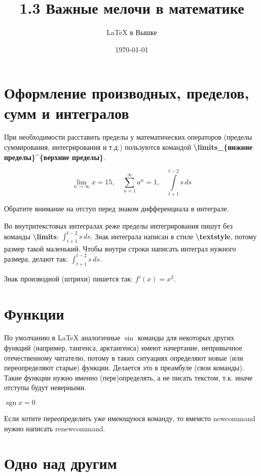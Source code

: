\documentclass[a4paper,12pt]{article}
\author{\LaTeX{} в Вышке}
\title{1.3 Важные мелочи в математике}
\date{\today}
\newcommand{\sgn}{\mathop{\mathrm{sgn}}\nolimits}
\begin{document}

\maketitle %


\section{Оформление производных, пределов, сумм и интегралов}

При необходимости расставить пределы у математических операторов (пределы суммирования, интегрирования и т.д.) пользуются командой \textbf{\textbackslash limits\_\{нижние пределы\}\textasciicircum\{верхние пределы\}}.

$$ \lim\limits_{n\to\infty} x = 15, \quad \sum\limits_{n=1}^{\infty} a^n = 1, \quad \int\limits_{t+1}^{t-2} s \, ds$$

Обратите внимание на отступ перед знаком дифференциала в интеграле.

Во внутритекстовых интегралах реже пределы интегрирования пишут без команды \textbf{\textbackslash limits}: $\int_{t+1}^{t-2} s \, ds$. Знак интеграла написан в стиле \textbf{\textbackslash textstyle}, потому размер такой маленький. Чтобы внутри строки написать интеграл нужного размера, делают так: $\displaystyle \int_{t+1}^{t-2} s \, ds$.

Знак производной (штрихи) пишется так: $ f'(x)=x^2$.
 
 
 
\section{Функции}

По умолчанию в \LaTeX{} аналогичные $\sin$ команды для некоторых других функций (например, тангенса, арктангенса) имеют начертание, непривычное отечественному читателю, потому в таких ситуациях определяют новые (или переопределяют старые) функции. Делается это в преамбуле (свои команды). Такие функции нужно именно (пере)определять, а не писать текстом, т.к. иначе отступы будут неверными.

$\sgn x=0$

Если хотите переопределить уже имеющуюся команду, то вмемсто newcommand нужно написать renewcommand.

\section{Одно над другим}
\end{document}
